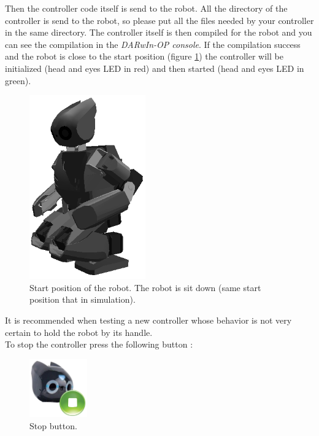 \documentclass[a4paper, 12pt]{article}  		%
\begin{document}
Then the controller code itself is send to the robot. All the directory of the controller is send to the robot, so please put all the files needed by your controller in the same directory. The controller itself is then compiled for the robot and you can see the compilation in the \textit{DARwIn-OP console}. If the compilation success and the robot is close to the start position (figure \ref{start_position}) the controller will be initialized (head and eyes LED in red) and then started (head and eyes LED in green).\\

\begin{figure}[H]
\begin{center}
\includegraphics[width=5cm]{start_position.png}
\caption{Start position of the robot. The robot is sit down (same start position that in simulation).}
\label{start_position}
\end{center}
\end{figure}

It is recommended when testing a new controller whose behavior is not very certain to hold the robot by its handle.\\

To stop the controller press the following button :
\begin{figure}[H]
\begin{center}
\includegraphics[width=2.5cm]{stop.png}
\caption{Stop button.}
\label{stop}
\end{center}
\end{figure}
\end{document}

